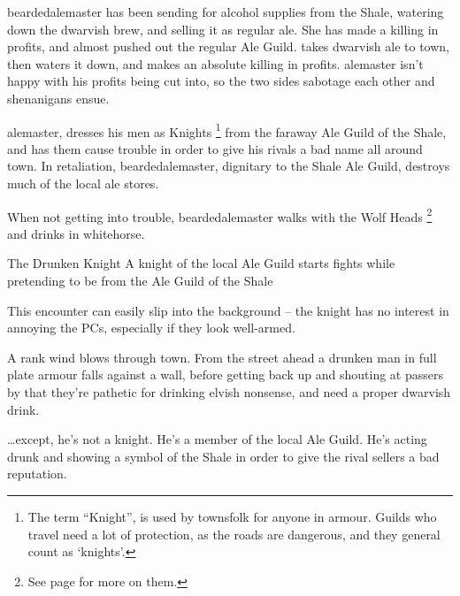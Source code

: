 \begin{multicols}{2}

\label{troubleAle}

\startcontents[sq]

\sqminitoc

\noindent
\Gls{beardedalemaster} has been sending for alcohol supplies from the Shale, watering down the dwarvish brew, and selling it as regular ale.
She has made a killing in profits, and almost pushed out the regular Ale Guild.
\iftoggle{aif}{%
  \footnote{This organization is also known as the `temple of Alass\"{e}' -- see page \pageref{guilds} for more on divine monopolies.}%
}{}%
takes dwarvish ale to \gls{town}, then waters it down, and makes an absolute killing in profits.
\Gls{alemaster} isn't happy with his profits being cut into, so the two sides sabotage each other and shenanigans ensue.

\Gls{alemaster}, dresses his men as Knights%
\footnote{The term ``Knight'', is used by townsfolk for anyone in armour.
Guilds who travel need a lot of protection, as the roads are dangerous, and they general count as `knights'.}
from the faraway Ale Guild of the Shale, and has them cause trouble in order to give his rivals a bad name all around \gls{town}.
In retaliation, \gls{beardedalemaster}, dignitary to the Shale Ale Guild, destroys much of the local ale stores.

When not getting into trouble, \Gls{beardedalemaster} walks with the Wolf Heads%
\footnote{See page \pageref{beardedalemaster} for more on them.}
and drinks in \gls{whitehorse}.

{The Drunken Knight}%
{A knight of the local Ale Guild starts fights while pretending to be from the Ale Guild of the Shale}%

This encounter can easily slip into the background -- the knight has no interest in annoying the PCs, especially if they look well-armed.

\begin{boxtext}

  A rank wind blows through \gls{town}.
  From the street ahead a drunken man in full plate armour falls against a wall, before getting back up and shouting at passers by that they're pathetic for drinking elvish nonsense, and need a proper dwarvish drink.

\end{boxtext}

\ldots except, he's not a knight.
He's a member of the local Ale Guild.
He's acting drunk and showing a symbol of the Shale in order to give the rival sellers a bad reputation.


\end{multicols}
